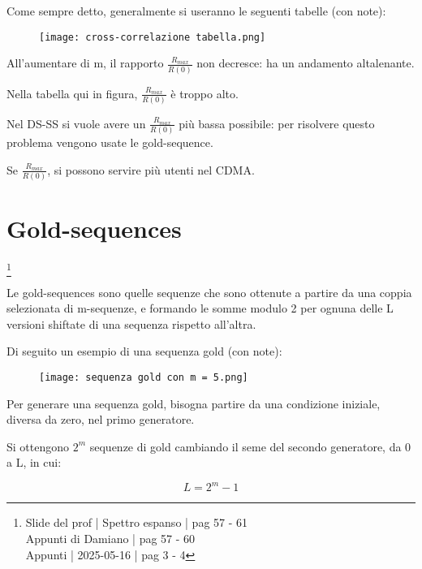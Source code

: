 Come sempre detto, 
generalmente si useranno le seguenti tabelle (con note): 

\begin{figure}[h]
    \centering
    \texttt{[image: cross-correlazione tabella.png]}
\end{figure}

All'aumentare di m, 
il rapporto $\frac{R_{max}}{R(0)}$ non decresce: ha un andamento altalenante. \newline 

Nella tabella qui in figura, $\frac{R_{max}}{R(0)}$ è troppo alto. \newline 

Nel DS-SS si vuole avere un $\frac{R_{max}}{R(0)}$ più bassa possibile: 
per risolvere questo problema vengono usate le gold-sequence. \newline 

Se $\frac{R_{max}}{R(0)}$, si possono servire più utenti nel CDMA. \newline 

\newpage 

\section{Gold-sequences}
\footnote{Slide del prof | Spettro espanso | pag 57 - 61 \\
Appunti di Damiano | pag 57 - 60\\
Appunti | 2025-05-16 | pag 3 - 4
} 

Le gold-sequences sono quelle sequenze che sono ottenute a partire da una coppia selezionata di m-sequenze, 
e formando le somme modulo 2 per ognuna delle L versioni shiftate di una sequenza rispetto all'altra. \newline 

Di seguito un esempio di una sequenza gold (con note): 

\begin{figure}[h]
    \centering
    \texttt{[image: sequenza gold con m = 5.png]}
\end{figure}

Per generare una sequenza gold, 
bisogna partire da una condizione iniziale, diversa da zero, 
nel primo generatore. \newline 

Si ottengono $2^{m}$ sequenze di gold cambiando il seme del secondo generatore, 
da 0 a L, in cui: 

{
    \Large 
    \begin{equation}
        L = 2^{m} - 1
    \end{equation}
}

